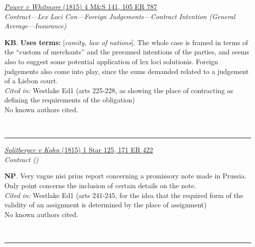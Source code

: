 \documentclass[twoside]{article}
\begin{document}
        \begin{small}
        \begin{center}
        \href{https://heinonline.org/HOL/P?h=hein.engrep/engrf0105&i=791}{\textit{Power v Whitmore} (1815) 4 M\&S 141, 105 ER 787} \label{34} \\ 
\textit{Contract---Lex Loci Con---Foreign Judgements---Contract Intention (General Average---Insurance)}\\
        \end{center}
        \textbf{KB}.  \textbf{Uses terms: }[\textit{comity, law of nations}]. The whole case is framed in terms of the “custom of merchants” and the presumed intentions of the parties, and seems also to suggest some potential application of lex loci solutionis. Foreign judgements also come into play, since the sums demanded related to a judgement of a Lisbon court.\\\textit{Cited in: }Westlake Ed1 (arts 225-228, as showing the place of contracting as defining the requirements of the obligation)\\No known authors cited.
        \end{small}\\
        \rule{\textwidth}{0.5pt}
        

        \begin{small}
        \begin{center}
        \href{https://heinonline.org/HOL/P?h=hein.engrep/engrg0127&i=187}{\textit{Splitberger v Kohn} (1815) 1 Star 125, 171 ER 422} \label{47} \\ 
\textit{Contract ()}\\
        \end{center}
        \textbf{NP}. Very vague nisi prius report concerning a promissory note made in Prussia. Only point concerns the inclusion of certain details on the note.\\\textit{Cited in: }Westlake Ed1 (arts 241-245, for the idea that the required form of the validity of an assignment is determined by the place of assignment)\\No known authors cited.
        \end{small}\\
        \rule{\textwidth}{0.5pt}
        
\end{document}
